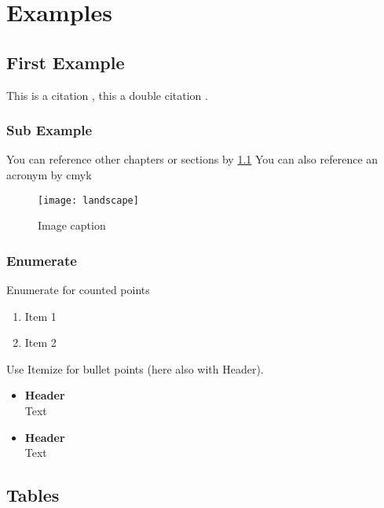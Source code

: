 \chapter{Examples}
\label{chap:examples}

\section{First Example}
\label{chap:first_example}
This is a citation \cite{buch}, this a double citation \cite{buch, buch}.

\subsection{Sub Example}
\label{chap:second_example}

You can reference other chapters or sections by \ref{chap:first_example} 
You can also reference an acronym by \ac{cmyk}


\vspace{5mm}
\begin{figure}[htbp]
	\centering
	\begin{minipage}{0.7\linewidth}
		\texttt{[image: landscape]}
	\end{minipage}
	\caption{Image caption \cite[S.~5]{buch}}
	\label{img:example_img}
\end{figure}

\subsection{Enumerate}

Enumerate for counted points
\begin{enumerate}
	\item Item 1
	\item Item 2
\end{enumerate}

Use Itemize for bullet points (here also with Header).
\begin{itemize}
	\item \textbf{Header} \\
	Text
	
	\item \textbf{Header} \\
	Text
\end{itemize}

\section{Tables}


